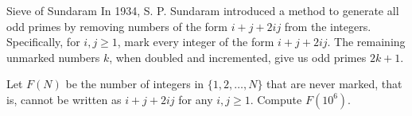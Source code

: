 \begin{problem}{Sieve of Sundaram}
    In 1934, S. P. Sundaram introduced a method to generate all odd primes by removing numbers of the form \(i + j + 2ij\) from the integers. Specifically, for \(i, j \geq 1\), mark every integer of the form \(i + j + 2ij\). The remaining unmarked numbers \(k\), when doubled and incremented, give us odd primes \(2k+1\).

    Let \(F(N)\) be the number of integers in \(\{1, 2, \ldots, N\}\) that are never marked, that is, cannot be written as \(i + j + 2ij\) for any \(i, j \geq 1\). Compute \(F(10^6)\).

    
\end{problem}
